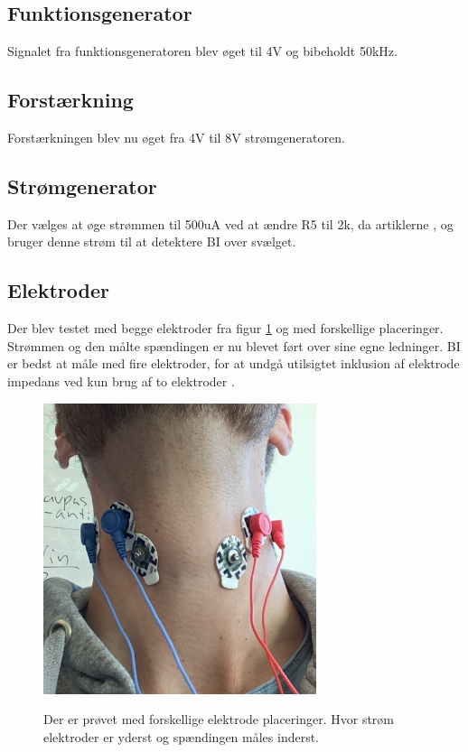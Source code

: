 \subsection{Funktionsgenerator}
Signalet fra funktionsgeneratoren blev øget til 4V og bibeholdt 50kHz.
\subsection{Forstærkning}
Forstærkningen blev nu øget fra 4V til 8V strømgeneratoren.

\subsection{Strømgenerator}
Der vælges at øge strømmen til 500uA ved at ændre R5 til 2k, da artiklerne \cite{Chester}, \cite{Chester2014} og \cite{Kusuhara2004} bruger denne strøm til at detektere BI over svælget. 





\subsection{Elektroder}

Der blev testet med begge elektroder fra figur \ref{fig:elektroder} og med forskellige placeringer. Strømmen og den målte spændingen er nu blevet ført over sine egne ledninger. BI er bedst at måle med fire elektroder, for at undgå utilsigtet inklusion af elektrode impedans ved kun brug af to elektroder \cite[s. 420-421]{Holder2004}.


\begin{figure}[H]
\centering
{\includegraphics[width=8cm]
{Figure/elektrodeplacering1}}
\caption{Der er prøvet med forskellige elektrode placeringer. Hvor strøm elektroder er yderst og spændingen måles inderst.}
\label{fig:elektroder}
\end{figure}




